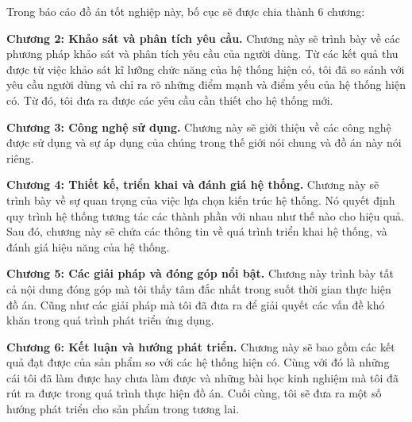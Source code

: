 \documentclass[../DoAn.tex]{subfiles}
\begin{document}


Trong báo cáo đồ án tốt nghiệp này, bố cục sẽ được chia thành 6 chương:

\textbf{Chương 2: Khảo sát và phân tích yêu cầu.} Chương này sẽ trình bày về các phương pháp khảo sát và phân tích yêu cầu của người dùng. Từ các kết quả thu được từ việc khảo sát kĩ lưỡng chức năng của hệ thống hiện có, tôi đã so sánh với yêu cầu người dùng và chỉ ra rõ những điểm mạnh và điểm yếu của hệ thống hiện có. Từ đó, tôi đưa ra được các yêu cầu cần thiết cho hệ thống mới.

\textbf{Chương 3: Công nghệ sử dụng.} Chương này sẽ giới thiệu về các công nghệ được sử dụng và sự áp dụng của chúng trong thế giới nói chung và đồ án này nói riêng.

\textbf{Chương 4: Thiết kế, triển khai và đánh giá hệ thống.} Chương này sẽ trình bày về sự quan trọng của việc lựa chọn kiến trúc hệ thống. Nó quyết định quy trình hệ thống tương tác các thành phần với nhau như thế nào cho hiệu quả. Sau đó, chương này sẽ chứa các thông tin về quá trình triển khai hệ thống, và đánh giá hiệu năng của hệ thống.

\textbf{Chương 5: Các giải pháp và đóng góp nổi bật.} Chương này trình bày tất cả nội dung đóng góp mà tôi thấy tâm đắc nhất trong suốt thời gian thực hiện đồ án. Cũng như các giải pháp mà tôi đã đưa ra để giải quyết các vấn đề khó khăn trong quá trình phát triển ứng dụng.

\textbf{Chương 6: Kết luận và hướng phát triển.} Chương này sẽ bao gồm các kết quả đạt được của sản phẩm so với các hệ thống hiện có. Cùng với đó là những cái tôi đã làm được hay chưa làm được và những bài học kinh nghiệm mà tôi đã rút ra được trong quá trình thực hiện đồ án. Cuối cùng, tôi sẽ đưa ra một số hướng phát triển cho sản phẩm trong tương lai.
\end{document}
